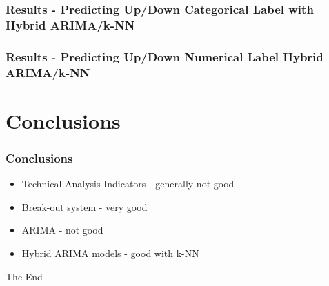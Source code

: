 \documentclass{beamer}
\begin{document}
\begin{frame}
\frametitle{Results - Predicting Up/Down Categorical Label with Hybrid ARIMA/k-NN }

%


\end{frame}

\begin{frame}
\frametitle{Results - Predicting Up/Down Numerical Label Hybrid ARIMA/k-NN}

%


\end{frame}


\section{Conclusions} %
\begin{frame}
\frametitle{Conclusions}

\begin{itemize}
\item Technical Analysis Indicators - generally not good \pause
\item Break-out system - very good \pause
\item ARIMA - not good \pause
\item Hybrid ARIMA models - good with k-NN
\end{itemize}

\end{frame}


\begin{frame}
\Huge{\centerline{The End}}
\end{frame}

\end{document}
